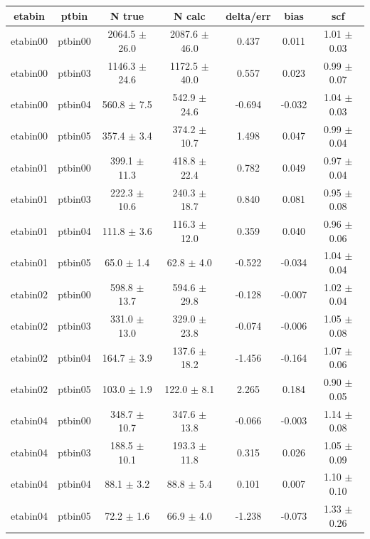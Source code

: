 \begin{table}
    \centering
        \begin{tabular}{|c|c|c|c|c|c|c|} \hline
    etabin & ptbin & N true & N calc & delta/err & bias & scf \\ \hline
  etabin00 & ptbin00 &2064.5 $\pm$ 26.0 & 2087.6 $\pm$ 46.0  & 0.437  & 0.011  & 1.01 $\pm$ 0.03   \\    
  etabin00 & ptbin03 &1146.3 $\pm$ 24.6 & 1172.5 $\pm$ 40.0  & 0.557  & 0.023  & 0.99 $\pm$ 0.07     \\  
  etabin00 & ptbin04 &560.8 $\pm$ 7.5   & 542.9 $\pm$ 24.6   & -0.694 & -0.032 & 1.04 $\pm$ 0.03       \\
  etabin00 & ptbin05 &357.4 $\pm$ 3.4   & 374.2 $\pm$ 10.7   & 1.498  & 0.047  & 0.99 $\pm$ 0.04       \\
  etabin01 & ptbin00 &399.1 $\pm$ 11.3  & 418.8 $\pm$ 22.4   & 0.782  & 0.049  & 0.97 $\pm$ 0.04       \\
  etabin01 & ptbin03 &222.3 $\pm$ 10.6  & 240.3 $\pm$ 18.7   & 0.840  & 0.081  & 0.95 $\pm$ 0.08       \\
  etabin01 & ptbin04 &111.8 $\pm$ 3.6   & 116.3 $\pm$ 12.0   & 0.359  & 0.040  & 0.96 $\pm$ 0.06       \\
  etabin01 & ptbin05 &65.0 $\pm$ 1.4    & 62.8 $\pm$ 4.0     & -0.522 & -0.034 & 1.04 $\pm$ 0.04       \\
  etabin02 & ptbin00 &598.8 $\pm$ 13.7  & 594.6 $\pm$ 29.8   & -0.128 & -0.007 & 1.02 $\pm$ 0.04       \\
  etabin02 & ptbin03 &331.0 $\pm$ 13.0  & 329.0 $\pm$ 23.8   & -0.074 & -0.006 & 1.05 $\pm$ 0.08       \\
  etabin02 & ptbin04 &164.7 $\pm$ 3.9   & 137.6 $\pm$ 18.2   & -1.456 & -0.164 & 1.07 $\pm$ 0.06       \\
  etabin02 & ptbin05 &103.0 $\pm$ 1.9   & 122.0 $\pm$ 8.1    & 2.265  & 0.184  & 0.90 $\pm$ 0.05       \\
  etabin04 & ptbin00 &348.7 $\pm$ 10.7  & 347.6 $\pm$ 13.8   & -0.066 & -0.003 & 1.14 $\pm$ 0.08       \\
  etabin04 & ptbin03 &188.5 $\pm$ 10.1  & 193.3 $\pm$ 11.8   & 0.315  & 0.026  & 1.05 $\pm$ 0.09       \\
  etabin04 & ptbin04 &88.1 $\pm$ 3.2    & 88.8 $\pm$ 5.4     & 0.101  & 0.007  & 1.10 $\pm$ 0.10       \\
  etabin04 & ptbin05 &72.2 $\pm$ 1.6    & 66.9 $\pm$ 4.0     & -1.238 & -0.073 & 1.33 $\pm$ 0.26       \\

\end{tabular}
\end{table}
